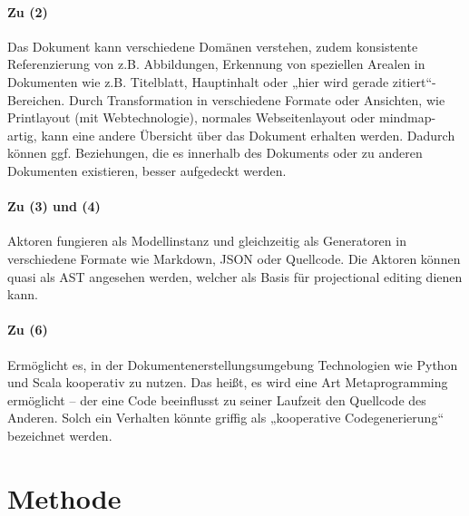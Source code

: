 \paragraph{Zu (2)} Das Dokument kann verschiedene Domänen verstehen, zudem konsistente Referenzierung von z.B. Abbildungen, Erkennung von speziellen Arealen in Dokumenten wie z.B. Titelblatt, Hauptinhalt oder „hier wird gerade zitiert“-Bereichen.  Durch Transformation in verschiedene Formate oder Ansichten, wie Printlayout (mit Webtechnologie), normales Webseitenlayout oder mindmap-artig, kann eine andere Übersicht über das Dokument erhalten werden. Dadurch können ggf. Beziehungen, die es innerhalb des Dokuments oder zu anderen Dokumenten existieren, besser aufgedeckt werden.

\paragraph{Zu (3) und (4)} Aktoren fungieren als Modellinstanz und gleichzeitig als Generatoren in verschiedene Formate wie Markdown, JSON oder Quellcode. Die Aktoren können quasi als AST angesehen werden, welcher als Basis für projectional editing dienen kann.

\paragraph{Zu (6)} Ermöglicht es, in der Dokumentenerstellungsumgebung Technologien wie Python und Scala kooperativ zu nutzen. Das heißt, es wird eine Art Metaprogramming ermöglicht -- der eine Code beeinflusst zu seiner Laufzeit den Quellcode des Anderen. Solch ein Verhalten könnte griffig als „kooperative Codegenerierung“ bezeichnet werden.











\section{Methode}

